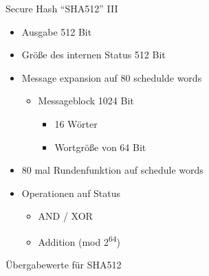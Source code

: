 \documentclass[
  10pt,
  ignorenonframetext,
  aspectratio=43,
]{beamer}
\providecommand{\tightlist}{%
  \setlength{\itemsep}{0pt}\setlength{\parskip}{0pt}}
\begin{document}
\begin{frame}{Secure Hash ``SHA512'' III}
\protect\hypertarget{secure-hash-sha512-iii}{}
\begin{itemize}
\tightlist
\item
  Ausgabe 512 Bit
\end{itemize}

\pause

\begin{itemize}
\tightlist
\item
  Größe des internen Status 512 Bit
\end{itemize}

\pause

\begin{itemize}
\item
  Message expansion auf 80 schedulde words

  \pause

  \begin{itemize}
  \item
    Messageblock 1024 Bit

    \pause

    \begin{itemize}
    \tightlist
    \item
      16 Wörter
    \end{itemize}

    \pause

    \begin{itemize}
    \tightlist
    \item
      Wortgröße von 64 Bit
    \end{itemize}
  \end{itemize}
\item
  80 mal Rundenfunktion auf schedule words
\end{itemize}

\pause

\begin{itemize}
\tightlist
\item
  Operationen auf Status

  \begin{itemize}
  \tightlist
  \item
    AND / XOR
  \item
    Addition (mod 2\textsuperscript{64})
  \end{itemize}
\end{itemize}
\end{frame}

\begin{frame}{Übergabewerte für SHA512}
\protect\hypertarget{uxfcbergabewerte-fuxfcr-sha512}{}
\end{frame}
\end{document}
